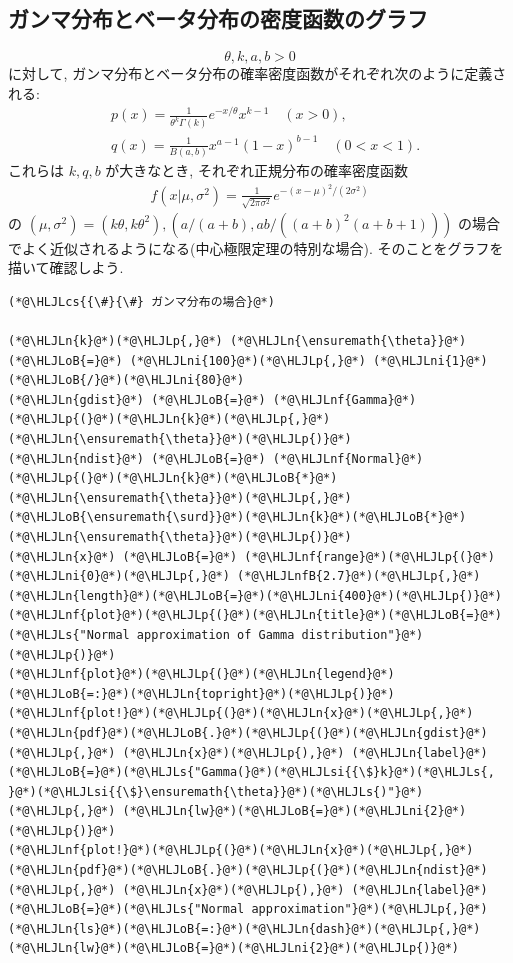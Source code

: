 \documentclass[12pt,a4paper,xelatex,ja=standard]{bxjsarticle}
\newcommand{\HLJLn}[1]{#1}
\newcommand{\HLJLnf}[1]{\textcolor[RGB]{66,102,213}{#1}}
\newcommand{\HLJLs}[1]{\textcolor[RGB]{201,61,57}{#1}}
\newcommand{\HLJLsi}[1]{#1}
\newcommand{\HLJLnfB}[1]{\textcolor[RGB]{59,151,46}{#1}}
\newcommand{\HLJLni}[1]{\textcolor[RGB]{59,151,46}{#1}}
\newcommand{\HLJLoB}[1]{\textcolor[RGB]{102,102,102}{\textbf{#1}}}
\newcommand{\HLJLp}[1]{#1}
\newcommand{\HLJLcs}[1]{\textcolor[RGB]{153,153,119}{\textit{#1}}}
\begin{document}
\subsection{ガンマ分布とベータ分布の密度函数のグラフ}
\[
\theta,k,a,b>0
\]
に対して, ガンマ分布とベータ分布の確率密度函数がそれぞれ次のように定義される:
\[
\begin{aligned}
&
p(x) = \frac{1}{\theta^k \Gamma(k)} e^{-x/\theta} x^{k-1} \quad (x>0),
\\ &
q(x) = \frac{1}{B(a,b)} x^{a-1}(1-x)^{b-1} \quad (0 < x < 1).
\end{aligned}
\]
これらは $k,q,b$ が大きなとき, それぞれ正規分布の確率密度函数
\[
\begin{aligned}
f(x|\mu,\sigma^2) = \frac{1}{\sqrt{2\pi\sigma^2}}e^{-(x-\mu)^2/(2\sigma^2)}
\end{aligned}
\]
の $(\mu,\sigma^2)=(k\theta, k\theta^2), (a/(a+b), ab/((a+b)^2(a+b+1)))$ の場合でよく近似されるようになる(中心極限定理の特別な場合). そのことをグラフを描いて確認しよう.


\begin{lstlisting}
(*@\HLJLcs{{\#}{\#} ガンマ分布の場合}@*)

(*@\HLJLn{k}@*)(*@\HLJLp{,}@*) (*@\HLJLn{\ensuremath{\theta}}@*) (*@\HLJLoB{=}@*) (*@\HLJLni{100}@*)(*@\HLJLp{,}@*) (*@\HLJLni{1}@*)(*@\HLJLoB{/}@*)(*@\HLJLni{80}@*)
(*@\HLJLn{gdist}@*) (*@\HLJLoB{=}@*) (*@\HLJLnf{Gamma}@*)(*@\HLJLp{(}@*)(*@\HLJLn{k}@*)(*@\HLJLp{,}@*) (*@\HLJLn{\ensuremath{\theta}}@*)(*@\HLJLp{)}@*)
(*@\HLJLn{ndist}@*) (*@\HLJLoB{=}@*) (*@\HLJLnf{Normal}@*)(*@\HLJLp{(}@*)(*@\HLJLn{k}@*)(*@\HLJLoB{*}@*)(*@\HLJLn{\ensuremath{\theta}}@*)(*@\HLJLp{,}@*) (*@\HLJLoB{\ensuremath{\surd}}@*)(*@\HLJLn{k}@*)(*@\HLJLoB{*}@*)(*@\HLJLn{\ensuremath{\theta}}@*)(*@\HLJLp{)}@*)
(*@\HLJLn{x}@*) (*@\HLJLoB{=}@*) (*@\HLJLnf{range}@*)(*@\HLJLp{(}@*)(*@\HLJLni{0}@*)(*@\HLJLp{,}@*) (*@\HLJLnfB{2.7}@*)(*@\HLJLp{,}@*) (*@\HLJLn{length}@*)(*@\HLJLoB{=}@*)(*@\HLJLni{400}@*)(*@\HLJLp{)}@*)
(*@\HLJLnf{plot}@*)(*@\HLJLp{(}@*)(*@\HLJLn{title}@*)(*@\HLJLoB{=}@*)(*@\HLJLs{"Normal approximation of Gamma distribution"}@*)(*@\HLJLp{)}@*)
(*@\HLJLnf{plot}@*)(*@\HLJLp{(}@*)(*@\HLJLn{legend}@*)(*@\HLJLoB{=:}@*)(*@\HLJLn{topright}@*)(*@\HLJLp{)}@*)
(*@\HLJLnf{plot!}@*)(*@\HLJLp{(}@*)(*@\HLJLn{x}@*)(*@\HLJLp{,}@*) (*@\HLJLn{pdf}@*)(*@\HLJLoB{.}@*)(*@\HLJLp{(}@*)(*@\HLJLn{gdist}@*)(*@\HLJLp{,}@*) (*@\HLJLn{x}@*)(*@\HLJLp{),}@*) (*@\HLJLn{label}@*)(*@\HLJLoB{=}@*)(*@\HLJLs{"Gamma(}@*)(*@\HLJLsi{{\$}k}@*)(*@\HLJLs{, }@*)(*@\HLJLsi{{\$}\ensuremath{\theta}}@*)(*@\HLJLs{)"}@*)(*@\HLJLp{,}@*) (*@\HLJLn{lw}@*)(*@\HLJLoB{=}@*)(*@\HLJLni{2}@*)(*@\HLJLp{)}@*)
(*@\HLJLnf{plot!}@*)(*@\HLJLp{(}@*)(*@\HLJLn{x}@*)(*@\HLJLp{,}@*) (*@\HLJLn{pdf}@*)(*@\HLJLoB{.}@*)(*@\HLJLp{(}@*)(*@\HLJLn{ndist}@*)(*@\HLJLp{,}@*) (*@\HLJLn{x}@*)(*@\HLJLp{),}@*) (*@\HLJLn{label}@*)(*@\HLJLoB{=}@*)(*@\HLJLs{"Normal approximation"}@*)(*@\HLJLp{,}@*) (*@\HLJLn{ls}@*)(*@\HLJLoB{=:}@*)(*@\HLJLn{dash}@*)(*@\HLJLp{,}@*) (*@\HLJLn{lw}@*)(*@\HLJLoB{=}@*)(*@\HLJLni{2}@*)(*@\HLJLp{)}@*)
\end{lstlisting}
\end{document}
